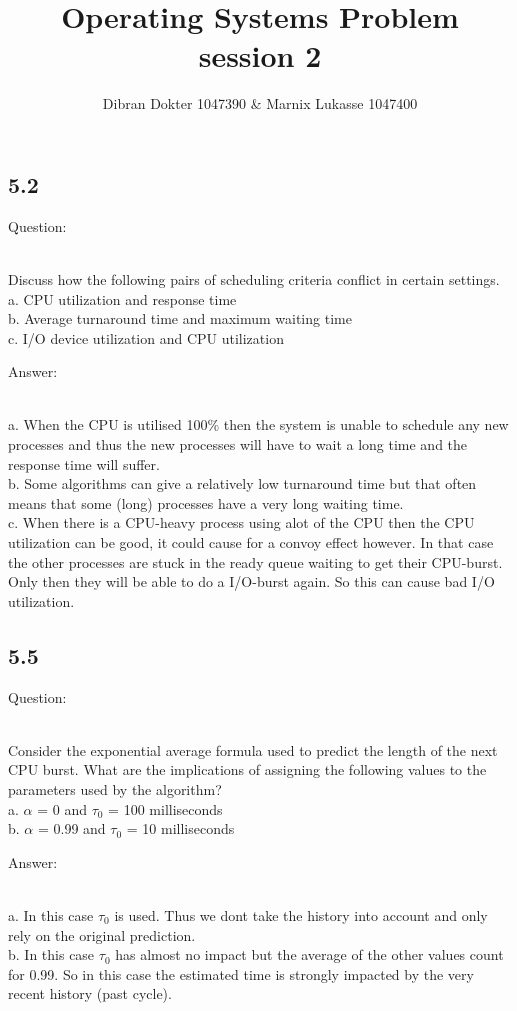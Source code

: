 \documentclass[]{article}
\title{Operating Systems Problem session 2}
\author{Dibran Dokter 1047390 \& Marnix Lukasse 1047400}
\begin{document}
\maketitle

\subsection*{5.2}
\begin{bfseries} Question: \end{bfseries}\\
Discuss how the following pairs of scheduling criteria conflict in certain
settings.\\
a. CPU utilization and response time\\
b. Average turnaround time and maximum waiting time\\
c. I/O device utilization and CPU utilization\\
\begin{bfseries} Answer: \end{bfseries}\\
a. When the CPU is utilised 100\% then the system is unable to schedule any new processes and thus the new processes will have to wait a long time and the response time will suffer.\\
b. Some algorithms can give a relatively low turnaround time but that often means that some (long) processes have a very long waiting time.\\
c. When there is a CPU-heavy process using alot of the CPU then the CPU utilization can be good, it could cause for a convoy effect however. In that case the other processes are stuck in the ready queue waiting to get their CPU-burst. Only then they will be able to do a I/O-burst again. So this can cause bad I/O utilization.\\

\subsection*{5.5}
\begin{bfseries} Question: \end{bfseries}\\
Consider the exponential average formula used to predict the length of
the next CPU burst. What are the implications of assigning the following
values to the parameters used by the algorithm?\\
a. $\alpha$ = 0 and $\tau_0$ = 100 milliseconds\\
b. $\alpha$ = 0.99 and $\tau_0$ = 10 milliseconds\\
\begin{bfseries} Answer: \end{bfseries}\\
a. In this case $\tau_0$ is used. Thus we dont take the history into account and only rely on the original prediction.\\
b. In this case $\tau_0$ has almost no impact but the average of the other values count for 0.99. So in this case the estimated time is strongly impacted by the very recent history (past cycle).\\
\end{document}
